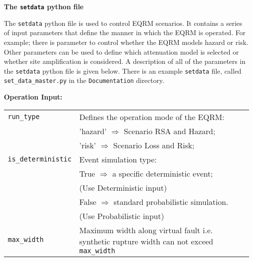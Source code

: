 \documentclass[a4paper, 12pt]{report}
\begin{document}
\newcommand{\indexfunc}[1]{\index{#1@\texttt{#1}}\index{function!#1@\texttt{#1}}}
\newcommand{\typepar}[3]{\linebreak[2]\texttt{#1}\-\texttt{#2}\-\texttt{#3}}
\newcommand{\typeself}[3]{\linebreak[2]\texttt{#1}\-\texttt{#2}\-\texttt{#3}\index{#1#2#3@\texttt{#1#2#3}}}
\newcommand{\indexpar}[1]{\index{#1@\texttt{#1}}\index{setdata parameter@ \texttt{setdata} parameter!#1@\texttt{#1}}}
\newcommand{\typefunc}[3]{\linebreak[2]\texttt{#1}\-\texttt{#2}\-\texttt{#3}\indexfunc{#1#2#3}}

\newcommand{\manual}[1]{Manual: #1}

\noindent \textbf{The \texttt{setdata} python file}

The \texttt{setdata} python file is used to control EQRM scenarios. It
contains a series of input parameters that define the
manner in which the EQRM is operated. For example; there is parameter to
control whether the EQRM models hazard or risk. Other parameters can be
used to define which attenuation model is selected or whether site
amplification is considered. A description of all of the parameters in the
 \texttt{setdata} python file is given below. There is an example
\texttt{setdata} file, called \texttt{set\_data\_master.py}
in the \texttt{Documentation} directory.

\vspace{2em} \noindent \textbf{Operation Input:}

\begin{supertabular}{lp{0.6\textwidth}}
\typepar{run\_type}{}{} & Defines the operation mode of the EQRM: \\
  & \hspace{0.5em} 'hazard' $\Rightarrow$ Scenario RSA and Hazard; \\
  & \hspace{0.5em} 'risk' $\Rightarrow$ Scenario Loss and Risk; \\
  \typepar{is\_deterministic}{}{} &  Event simulation type: \\
 & \hspace{0.5em} True $\Rightarrow$ a specific deterministic event;\\
 & \hspace{2.8em} (Use Deterministic input) \\
 & \hspace{0.5em} False $\Rightarrow$ standard probabilistic simulation. \\
 & \hspace{2.8em} (Use Probabilistic input) \\
\typepar{max\_width}{}{} & Maximum width along virtual fault i.e. synthetic rupture width can not exceed \typepar{max\_width}{}{}\\
\end{supertabular}
\end{document}
